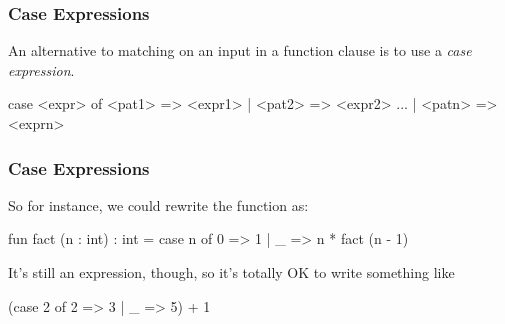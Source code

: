 \documentclass[aspectratio=169]{beamer}
\begin{document}


\begin{frame}[fragile]
  \frametitle{Case Expressions}

  An alternative to matching on an input in a function clause is to
  use a \textit{case expression}.

  \pause

  \begin{codeblock}
    case <expr> of
      <pat1> => <expr1>
    | <pat2> => <expr2>
    ...
    | <patn> => <exprn> 
  \end{codeblock}

  \vspace{\fill}


  \pause
  \vspace{\fill}

\end{frame}

\begin{frame}[fragile]
  \frametitle{Case Expressions}
  So for instance, we could rewrite the  function as:

  \begin{codeblock}
    fun fact (n : int) : int = 
      case n of
        0 => 1
      | _ => n * fact (n - 1)
  \end{codeblock}

  \pause
  \vspace{\fill}


  \pause
  \vspace{\fill}

  It's still an expression, though, so it's totally OK to write something like
  \begin{codeblock}
    (case 2 of
      2 => 3
    | _ => 5) + 1 
  \end{codeblock}
\end{frame}
\end{document}
